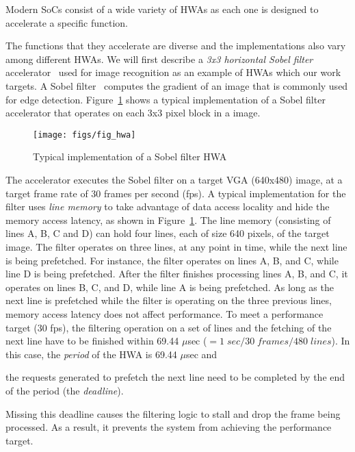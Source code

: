 \documentclass[10pt,letterpaper]{article}
\newcommand{\ADD}[1]{#1}
\newif\ifSQUEEZE
\begin{document}
Modern SoCs consist of a wide variety of HWAs as each one is designed to
accelerate a specific function. 
\ifSQUEEZE
The functions that they accelerate are diverse
and the implementations also vary among different HWAs. 
As an example, we will first describe a typical implementation of a 
\emph{3x3 horizontal Sobel filter} accelerator~\cite{Sobel} (shown in Figure~\ref{fig:HWAexample}), 
which computes the gradient of an image for image recognition. 
\else
The functions that they accelerate are diverse
and the implementations also vary among different HWAs. 
We will first describe a
\emph{3x3 horizontal Sobel filter} accelerator~\cite{Sobel} used for image recognition as an
example of HWAs which our work targets. 
A Sobel filter~\cite{Sobel} computes the gradient of an image that is commonly used for edge detection. 
Figure~\ref{fig:HWAexample}
shows a typical implementation of a Sobel filter accelerator that operates on
each 3x3 pixel block in a image.
\fi

\begin{figure}[h!]
  \centering
  \texttt{[image: figs/fig\_hwa]}
  \caption{Typical implementation of a Sobel filter HWA}
  \label{fig:HWAexample}
\end{figure}

The accelerator executes the Sobel filter on a target VGA
(640x480) image, at a target frame rate of 30 frames per second
(fps). 
A typical implementation for the filter uses \emph{line memory}
to take advantage of data access locality and hide the memory
access latency, as shown in Figure~\ref{fig:HWAexample}. The line
memory (consisting of lines A, B, C and D) can hold four lines,
each of size 640 pixels, of the target image. The filter operates
on three lines, at any point in time, while the next line is being
prefetched. For instance, the filter operates on lines A, B, and
C, while line D is being prefetched. After the filter finishes
processing lines A, B, and C, it operates on lines B, C, and D,
while line A is being prefetched. As long as the next line is
prefetched while the filter is operating on the three previous
lines, memory access latency does not affect performance. To meet
a performance target (30 fps), the filtering operation on a
set of lines and the fetching of the next line have to be finished within
69.44 $\mu$sec ($=1\;sec/30\;frames/480\;lines$). In this case,
the \emph{period} of the HWA is 69.44 $\mu$sec and 
\ifSQUEEZE
the next line needs to be prefetched by the
end of the period (the \emph{deadline}).
\else
the requests
generated to prefetch the next line need to be completed by the
end of the period (the \emph{deadline}). 
\fi
Missing this deadline
causes the filtering logic to stall \ADD{and drop the frame being
processed}. As a result, it prevents the system from achieving the
performance target.
\end{document}
